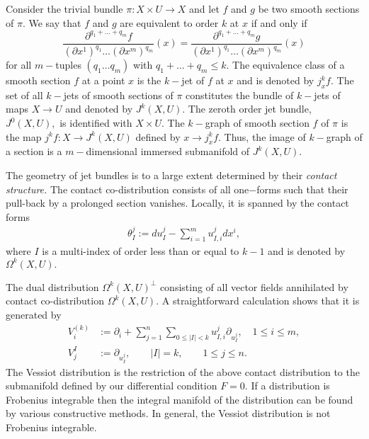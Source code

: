 \documentclass[a4paper, 11pt]{amsart}
\theoremstyle{definition}
\begin{document}
\noindent Consider the trivial bundle $\pi:X\times U\rightarrow X$ and let $f$ and $g$ be two smooth sections of $\pi$. We say that $f$ and $g$  are equivalent to order $k$ at $x$ if and only if  \[\frac{\partial^{q_1+ \ldots +q_m} f}{(\partial x^1)^{q_1}\ldots(\partial x^m)^{q_m}}(x)=\frac{\partial^{q_1+\ldots+q_m} g}{(\partial x^1)^{q_1}\ldots(\partial x^m)^{q_m}}(x)\] for all $m-$tuples $(q_1\ldots q_m)$ with $q_1+\ldots+q_m\leq k.$
The equivalence class of a smooth section $f$ at a point $x$ is the $k-$jet of $f$ at $x$  and is denoted by $j^k_x f.$ The set of all $k-$jets of smooth sections of $\pi$ constitutes the bundle of $k-$jets of maps $X\rightarrow U$ and denoted by $J^k(X,U).$ The zeroth order jet bundle, $J^0(X,U),$ is identified with $X\times U.$ The $k-$graph of smooth section $f$ of $\pi$ is the map $j^k f: X\rightarrow J^k(X,U)$ defined by $x\rightarrow j^k_x f.$ Thus, the image of $k-$graph of a section is a $m-$dimensional immersed submanifold of $J^k(X,U).$

The geometry of jet bundles is to a large extent determined by their \emph{contact structure.} The contact co-distribution consists of all one$-$forms such that their pull-back by a prolonged section vanishes. Locally, it is spanned by the contact forms
\begin{align}\label{contactsystem}
\theta^j_I:=d u^j_I-\sum_{i=1}^m u_{I, i}^j d x^i,
\end{align} where $I$ is a multi-index of order less than or equal to $k-1$ and is denoted by $\Omega^k(X,U).$

The dual distribution $\Omega^k(X,U)^\perp$ consisting of all vector fields annihilated by contact co-distribution $\Omega^k(X,U)$. A straightforward calculation \cite{Fesser09} shows that it is generated by
\begin{align}\label{Vessiot dist}
V_{i}^{(k)}&:=\partial_i+\sum_{j=1}^n \sum_{0\leq \left|I\right|<k}u_{I,i}^j\partial_{u^j_I},\quad 1\leq i\leq m,\nonumber \\
V_{j}^{I}&:=\partial_{u^j_I},\quad \quad \left|I\right|=k,\quad \quad 1\leq j \leq n.
\end{align}
The Vessiot distribution is the restriction of the above contact distribution to the submanifold defined by our differential condition $F = 0$.  If a distribution is Frobenius integrable then the integral manifold of the distribution can be found by various constructive methods. In general, the Vessiot distribution is not Frobenius integrable.
\end{document}
